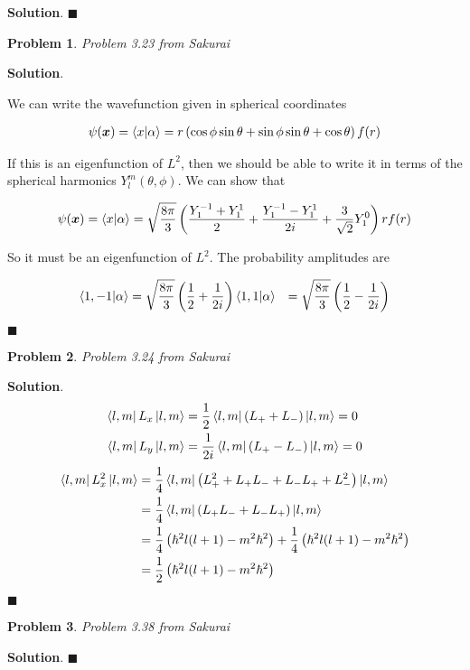 \documentclass[12pt]{article}
\newtheorem{p}{Problem}
\theoremstyle{definition}
\newenvironment{s}{%
        \begin{trivlist} \item \textbf{Solution}. }{%
            \hspace*{\fill} $\blacksquare$\end{trivlist}}%
\begin{document}
{\begin{s}
\end{s}

\begin{p}
Problem 3.23 from Sakurai
\end{p}

\begin{s}

We can write the wavefunction given in spherical coordinates

\begin{align*}
\psi(\bm{x}) = \bra{x}\ket{\alpha} = r\left(\cos\phi \sin\theta + \sin\phi\sin\theta + \cos\theta\right)f(r)
\end{align*}

If this is an eigenfunction of $L^{2}$, then we should be able to write it in terms of the spherical harmonics $Y_{l}^{m}(\theta,\phi)$. We can show that 

\begin{align*}
\psi(\bm{x}) = \bra{x}\ket{\alpha} = \sqrt{\frac{8\pi}{3}}\left(\frac{Y_{1}^{-1}+Y_{1}^{1}}{2}+\frac{Y_{1}^{-1}-Y_{1}^{1}}{2i} + \frac{3}{\sqrt{2}}Y_{1}^{0}\right)rf(r)
\end{align*}

So it must be an eigenfunction of $L^{2}$. The probability amplitudes are

\begin{align*}
\bra{1,-1}\ket{\alpha} &= \sqrt{\frac{8\pi}{3}}\left(\frac{1}{2}+\frac{1}{2i}\right)
\bra{1,1}\ket{\alpha} &= \sqrt{\frac{8\pi}{3}}\left(\frac{1}{2}-\frac{1}{2i}\right)
\end{align*}



\end{s}

\begin{p}
Problem 3.24 from Sakurai
\end{p}

\begin{s}
\begin{align*}
\bra{l,m}L_{x}\ket{l,m} &= \frac{1}{2}\bra{l,m}\left(L_{+}+L_{-}\right)\ket{l,m} = 0\\
\bra{l,m}L_{y}\ket{l,m} &= \frac{1}{2i}\bra{l,m}\left(L_{+}-L_{-}\right)\ket{l,m} = 0
\end{align*}
\begin{align*}
\bra{l,m}L_{x}^{2}\ket{l,m} &= \frac{1}{4}\bra{l,m}\left(L_{+}^{2}+L_{+}L_{-}+L_{-}L_{+}+L_{-}^{2}\right)\ket{l,m}\\
&= \frac{1}{4}\bra{l,m}\left(L_{+}L_{-}+L_{-}L_{+}\right)\ket{l,m}\\
&= \frac{1}{4}\left(\hbar^{2}l(l+1)-m^{2}\hbar^{2}\right) + \frac{1}{4}\left(\hbar^{2}l(l+1)-m^{2}\hbar^{2}\right) \\
&= \frac{1}{2}\left(\hbar^{2}l(l+1)-m^{2}\hbar^{2}\right)\\
\end{align*}


\end{s}
\begin{p}
Problem 3.38 from Sakurai
\end{p}

\begin{s}
\end{s}
\end{document}
